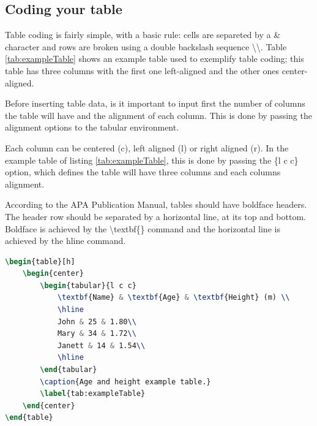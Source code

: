 		\subsection{Coding your table}

	Table coding is fairly simple, with a basic rule: cells are separeted by a {\ttfamily \&} character and rows are broken using a double backslash sequence \textbackslash \textbackslash. Table \ref{tab:exampleTable} shows an example table used to exemplify table coding; this table has three columns with the first one left-aligned and the other ones center-aligned.

	Before inserting table data, is it important to input first the number of columns the table will have and the alignment of each column. This is done by passing the alignment options to the {\ttfamily tabular} environment.

	Each column can be centered ({\ttfamily c}), left aligned ({\ttfamily l}) or right aligned ({\ttfamily r}). In the example table of listing \ref{tab:exampleTable}, this is done by passing the {\ttfamily \{l c c\}} option, which defines the table will have three columns and each columns alignment.

	According to the APA Publication Manual, tables should have boldface headers. The header row should be separated by a horizontal line, at its top and bottom. Boldface is achieved by the {\ttfamily \textbackslash textbf\{\}} command and the horizontal line is achieved by the {\ttfamily hline} command.

\begin{lstlisting}[caption = {Example table (table \ref{tab:exampleTable})}, label = {lst:exampleTable}, style = prettyListing, language = tex]
\begin{table}[h]
	\begin{center}
		\begin{tabular}{l c c}
			\textbf{Name} & \textbf{Age} & \textbf{Height} (m) \\
			\hline
			John & 25 & 1.80\\
			Mary & 34 & 1.72\\
			Janett & 14 & 1.54\\
			\hline
		\end{tabular}
		\caption{Age and height example table.}
		\label{tab:exampleTable}
	\end{center}
\end{table}
\end{lstlisting}

